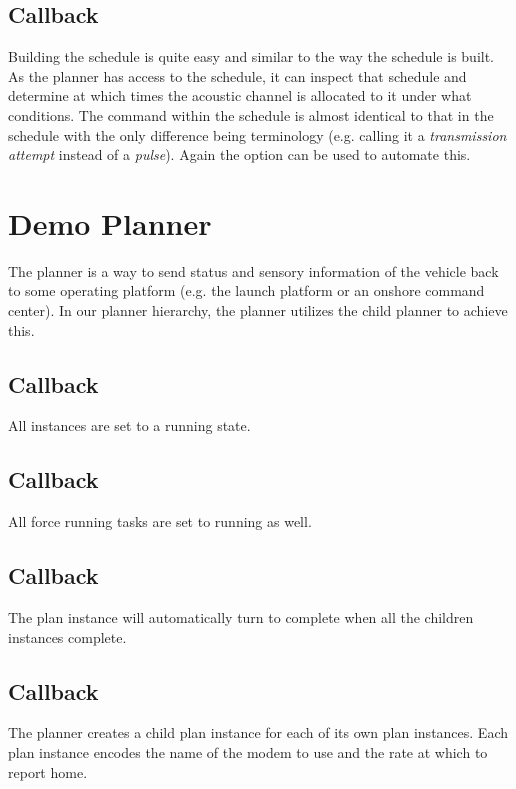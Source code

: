 \subsection{Callback }
Building the schedule is quite easy and similar to the way the  schedule is built. As the  planner has access to the  schedule, it can inspect that schedule and determine at which times the acoustic channel is allocated to it under what conditions. The command within the  schedule is almost identical to that in the  schedule with the only difference being terminology (e.g. calling it a \textit{transmission attempt} instead of a \textit{pulse}). Again the  option can be used to automate this.

\section{Demo  Planner}
The  planner is a way to send status and sensory information of the vehicle back to some operating platform (e.g. the launch platform or an onshore command center). In our planner hierarchy, the  planner utilizes the  child planner to achieve this.

\subsection{Callback }
All instances are set to a running state.

\subsection{Callback }
All force running tasks are set to running as well.

\subsection{Callback }
The plan instance will automatically turn to complete when all the  children instances complete.

\subsection{Callback }
The  planner creates a child  plan instance for each of its own plan instances. Each plan instance encodes the name of the modem to use and the rate at which to report home.

